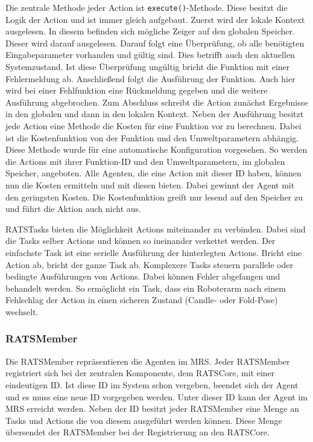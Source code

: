 Die zentrale Methode jeder Action ist  \lstinline|execute()|-Methode. Diese besitzt die Logik der Action und ist immer gleich aufgebaut. Zuerst wird der lokale Kontext ausgelesen. In diesem befinden sich mögliche Zeiger auf den globalen Speicher. Dieser wird darauf ausgelesen. Darauf folgt eine Überprüfung, ob alle benötigten Eingabeparameter vorhanden und gültig sind. Dies betrifft auch den aktuellen Systemzustand. Ist diese Überprüfung ungültig bricht die Funktion mit einer Fehlermeldung ab. Anschließend folgt die Ausführung der Funktion. Auch hier wird bei einer Fehlfunktion eine Rückmeldung gegeben und die weitere Ausführung abgebrochen. Zum Abschluss schreibt die Action zunächst Ergebnisse in den globalen und dann in den lokalen Kontext. Neben der Ausführung besitzt jede Action eine Methode die Kosten für eine Funktion vor zu berechnen. Dabei ist die Kostenfunktion von der Funktion und den Umweltparametern abhängig. Diese Methode wurde für eine automatische Konfiguration vorgesehen. So werden die Actions mit ihrer Funktion-ID und den Umweltparametern, im globalen Speicher, angeboten. Alle Agenten, die eine Action mit dieser ID haben, können nun die Kosten ermitteln und mit diesen bieten. Dabei gewinnt der Agent mit den geringsten Kosten. Die Kostenfunktion greift nur lesend auf den Speicher zu und führt die Aktion auch nicht aus.

RATSTasks bieten die Möglichkeit Actions miteinander zu verbinden. Dabei sind die Tasks selber Actions und können so ineinander verkettet werden. Der einfachste Task ist eine serielle Ausführung der hinterlegten Actions. Bricht eine Action ab, bricht der ganze Task ab. Komplexere Tasks steuern parallele oder bedingte Ausführungen von Actions. Dabei können Fehler abgefangen und behandelt werden. So ermöglicht ein Task, dass ein Roboterarm nach einem Fehlschlag der Action in einen sicheren Zustand (Candle- oder Fold-Pose) wechselt.


\subsubsection{RATSMember}
Die RATSMember repräsentieren die Agenten im MRS. Jeder RATSMember registriert sich bei der zentralen Komponente, dem RATSCore, mit einer eindeutigen ID. Ist diese ID im System schon vergeben, beendet sich der Agent und es muss eine neue ID vorgegeben werden. Unter dieser ID kann der Agent im MRS erreicht werden. Neben der ID besitzt jeder RATSMember eine Menge an Tasks und Actions die von diesem ausgeführt werden können. Diese Menge übersendet der RATSMember bei der Registrierung an den RATSCore. 

